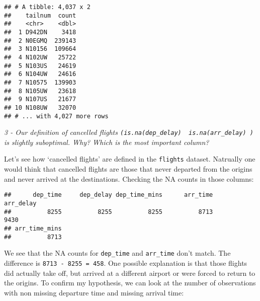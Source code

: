 \documentclass[]{article}
\newenvironment{Shaded}{\begin{snugshade}}{\end{snugshade}}
\newcommand{\KeywordTok}[1]{\textcolor[rgb]{0.13,0.29,0.53}{\textbf{#1}}}
\newcommand{\StringTok}[1]{\textcolor[rgb]{0.31,0.60,0.02}{#1}}
\newcommand{\ControlFlowTok}[1]{\textcolor[rgb]{0.13,0.29,0.53}{\textbf{#1}}}
\newcommand{\OperatorTok}[1]{\textcolor[rgb]{0.81,0.36,0.00}{\textbf{#1}}}
\newcommand{\NormalTok}[1]{#1}
\theoremstyle{definition}
\theoremstyle{definition}
\theoremstyle{definition}
\theoremstyle{remark}
\begin{document}
\begin{verbatim}
## # A tibble: 4,037 x 2
##    tailnum  count
##    <chr>    <dbl>
##  1 D942DN    3418
##  2 N0EGMQ  239143
##  3 N10156  109664
##  4 N102UW   25722
##  5 N103US   24619
##  6 N104UW   24616
##  7 N10575  139903
##  8 N105UW   23618
##  9 N107US   21677
## 10 N108UW   32070
## # ... with 4,027 more rows
\end{verbatim}

\emph{3 - Our definition of cancelled flights
\texttt{(is.na(dep\_delay)\ \textbar{}\ is.na(arr\_delay)\ )} is
slightly suboptimal. Why? Which is the most important column?}

Let's see how `cancelled flights' are defined in the \texttt{flights}
dataset. Natrually one would think that cancelled flights are those that
never departed from the origins and never arrived at the destinations.
Checking the NA counts in those columns:

\begin{Shaded}
\end{Shaded}

\begin{verbatim}
##      dep_time     dep_delay dep_time_mins      arr_time     arr_delay 
##          8255          8255          8255          8713          9430 
## arr_time_mins 
##          8713
\end{verbatim}

We see that the NA counts for \texttt{dep\_time} and \texttt{arr\_time}
don't match. The difference is \texttt{8713\ -\ 8255\ =\ 458}. One
possible explanation is that those flights did actually take off, but
arrived at a different airport or were forced to return to the origins.
To confirm my hypothesis, we can look at the number of observations with
non missing departure time and missing arrival time:

\begin{Shaded}
\end{Shaded}
\end{document}

